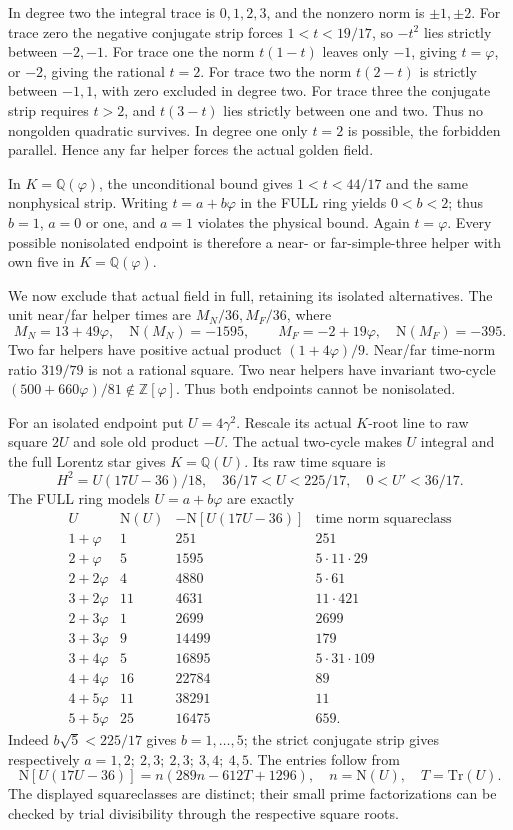 In degree two the integral trace is \(0,1,2,3\), and the nonzero
norm is \(\pm1,\pm2\).
For trace zero the negative conjugate strip forces
\(1<t<19/17\), so \(-t^2\) lies strictly between \(-2,-1\).
For trace one the norm \(t(1-t)\) leaves only \(-1\), giving
\(t=\varphi\), or \(-2\), giving the rational \(t=2\).
For trace two the norm \(t(2-t)\) is strictly between \(-1,1\),
with zero excluded in degree two.
For trace three the conjugate strip requires \(t>2\), and
\(t(3-t)\) lies strictly between one and two.
Thus no nongolden quadratic survives.
In degree one only \(t=2\) is possible, the forbidden parallel.
Hence any far helper forces the actual golden field.

In \(K=\mathbb Q(\varphi)\), the unconditional bound gives
\(1<t<44/17\) and the same nonphysical strip.
Writing \(t=a+b\varphi\) in the FULL ring yields \(0<b<2\);
thus \(b=1\), \(a=0\) or one, and \(a=1\) violates the
physical bound.  Again \(t=\varphi\).
Every possible nonisolated endpoint is therefore a near- or
far-simple-three helper with own five in \(K=\mathbb Q(\varphi)\).

We now exclude that actual field in full, retaining its isolated
alternatives.  The unit near/far helper times are \(M_N/36,M_F/36\),
where
\[
 M_N=13+49\varphi,\quad \mathrm N(M_N)=-1595,\qquad
 M_F=-2+19\varphi,\quad \mathrm N(M_F)=-395 .
\]
Two far helpers have positive actual product \((1+4\varphi)/9\).
Near/far time-norm ratio \(319/79\) is not a rational square.
Two near helpers have invariant two-cycle
\((500+660\varphi)/81\notin\mathbb Z[\varphi]\).
Thus both endpoints cannot be nonisolated.

For an isolated endpoint put \(U=4\gamma^2\).
Rescale its actual \(K\)-root line to raw square \(2U\) and
sole old product \(-U\).
The actual two-cycle makes \(U\) integral and the full Lorentz
star gives \(K=\mathbb Q(U)\).
Its raw time square is
\[
 H^2=U(17U-36)/18,\quad
 36/17<U<225/17,\quad0<U'<36/17 .
\]
The FULL ring models \(U=a+b\varphi\) are exactly
\[
\begin{array}{c|r|r|r}
U&\mathrm N(U)&-\mathrm N[U(17U-36)]&
 \text{time norm squareclass}\\ \hline
1+\varphi&1&251&251\\
2+\varphi&5&1595&5\cdot11\cdot29\\
2+2\varphi&4&4880&5\cdot61\\
3+2\varphi&11&4631&11\cdot421\\
2+3\varphi&1&2699&2699\\
3+3\varphi&9&14499&179\\
3+4\varphi&5&16895&5\cdot31\cdot109\\
4+4\varphi&16&22784&89\\
4+5\varphi&11&38291&11\\
5+5\varphi&25&16475&659 .
\end{array}
\]
Indeed \(b\sqrt5<225/17\) gives \(b=1,\ldots,5\);
the strict conjugate strip gives respectively
\(a=1,2;\ 2,3;\ 2,3;\ 3,4;\ 4,5\).
The entries follow from
\[
 \mathrm N[U(17U-36)]
 =n(289n-612T+1296),\quad n=\mathrm N(U),\quad T=\mathrm{Tr}(U).
\]
The displayed squareclasses are distinct; their small prime
factorizations can be checked by trial divisibility through the
respective square roots.

